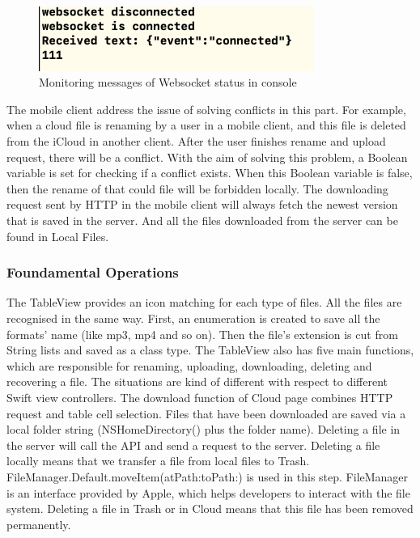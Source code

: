\documentclass{article}
\begin{document}
\begin{figure}[H]
\begin{center}
\includegraphics[width=9cm]{36.png}
\end{center}
\caption{Monitoring messages of Websocket status in console}\label{ex011}
\end{figure}

The mobile client address the issue of solving conflicts in this part. For example, when a cloud file is renaming by a user in a mobile client, and this file is deleted from the iCloud in another client. After the user finishes rename and upload request, there will be a conflict. With the aim of solving this problem, a Boolean variable is set for checking if a conflict exists. When this Boolean variable is false, then the rename of that could file will be forbidden locally. The downloading request sent by HTTP in the mobile client will always fetch the newest version that is saved in the server. And all the files downloaded from the server can be found in Local Files. 

\subsubsection{Foundamental Operations}

The TableView provides an icon matching for each type of files. All the files are recognised in the same way. First, an enumeration is created to save all the formats' name (like mp3, mp4 and so on). Then the file's extension is cut from String lists and saved as a class type. The TableView also has five main functions, which are responsible for renaming, uploading, downloading, deleting and recovering a file. The situations are kind of different with respect to different Swift view controllers. The download function of Cloud page combines HTTP request and table cell selection. Files that have been downloaded are saved via a local folder string (NSHomeDirectory() plus the folder name). Deleting a file in the server will call the API and send a request to the server. Deleting a file locally means that we transfer a file from local files to Trash. FileManager.Default.moveItem(atPath:toPath:) is used in this step. FileManager is an interface provided by Apple, which helps developers to interact with the file system. Deleting a file in Trash or in Cloud means that this file has been removed permanently. 
\end{document}
